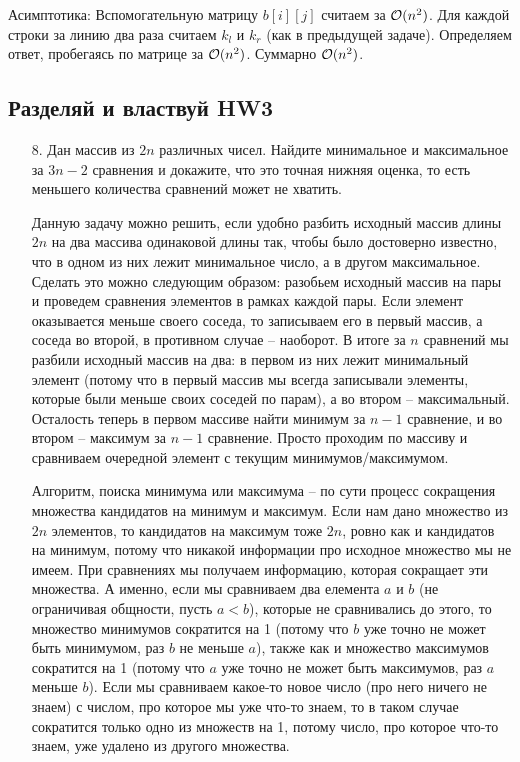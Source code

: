 \begin{enumerate}
\begin{solution}
        Асимптотика:
        Вспомогательную матрицу $b[i][j]$ считаем за $\mathcal{O}(n^2)$. Для каждой строки за линию два раза считаем $k_l$ и $k_r$ (как в предыдущей задаче). Определяем ответ, пробегаясь по матрице за $\mathcal{O}(n^2)$. Суммарно $\mathcal{O}(n^2)$.

    \end{solution}
\end{enumerate}

\subsection{Разделяй и властвуй HW3}
\begin{enumerate}
    \item[8.] Дан массив из $2n$ различных чисел. Найдите минимальное и максимальное за $3n - 2$ сравнения и докажите, что это точная нижняя оценка, то есть меньшего количества сравнений может не хватить.
    \begin{solution}
        Данную задачу можно решить, если удобно разбить исходный массив длины $2n$ на два массива одинаковой длины так, чтобы было достоверно известно, что в одном из них лежит минимальное число, а в другом максимальное. Сделать это можно следующим образом: разобьем исходный массив на пары и проведем сравнения элементов в рамках каждой пары. Если элемент оказывается меньше своего соседа, то записываем его в первый массив, а соседа во второй, в противном случае -- наоборот. В итоге за $n$ сравнений мы разбили исходный массив на два: в первом из них лежит минимальный элемент (потому что в первый массив мы всегда записывали элементы, которые были меньше своих соседей по парам), а во втором -- максимальный. Осталость теперь в первом массиве найти минимум за $n-1$ сравнение, и во втором -- максимум за $n-1$ сравнение. Просто проходим по массиву и сравниваем очередной элемент с текущим минимумов/максимумом.

        Алгоритм, поиска минимума или максимума -- по сути процесс сокращения множества кандидатов на минимум и максимум. Если нам дано множество из $2n$ элементов, то кандидатов на максимум тоже $2n$, ровно как и кандидатов на минимум, потому что никакой информации про исходное множество мы не имеем. При сравнениях мы получаем информацию, которая сокращает эти множества. А именно, если мы сравниваем два елемента $a$ и $b$ (не ограничивая общности, пусть $a<b$), которые не сравнивались до этого, то множество минимумов сократится на 1 (потому что $b$ уже точно не может быть минимумом, раз $b$ не меньше $a$), также как и множество максимумов сократится на 1 (потому что $a$ уже точно не может быть максимумов, раз $a$ меньше $b$). Если мы сравниваем какое-то новое число (про него ничего не знаем) с числом, про которое мы уже что-то знаем, то в таком случае сократится только одно из множеств на 1, потому число, про которое что-то знаем, уже удалено из другого множества.


\end{solution}
\end{enumerate}
